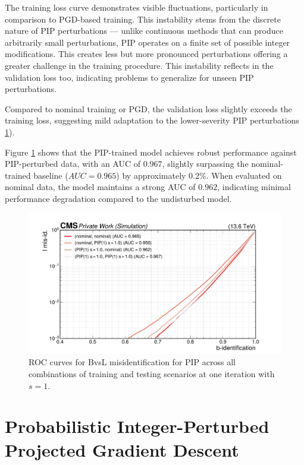 The training loss curve demonstrates visible fluctuations, particularly in comparison to PGD-based training. This instability stems from the discrete nature of PIP perturbations — unlike continuous methods that can produce arbitrarily small perturbations, PIP operates on a finite set of possible integer modifications. This creates less but more pronounced perturbations offering a greater challenge in the training procedure. This instability reflects in the validation loss too, indicating problems to generalize for unseen PIP perturbations. 

Compared to nominal training or PGD, the validation loss slightly exceeds the training loss, suggesting mild adaptation to the lower-severity PIP perturbations \ref{fig:intprob_rocs_training}).

Figure \ref{fig:intprob_rocs_training} shows that the PIP-trained model achieves robust performance against PIP-perturbed data, with an AUC of $0.967$, slightly surpassing the nominal-trained baseline ($AUC = 0.965$) by approximately $0.2\%$. When evaluated on nominal data, the model maintains a strong AUC of $0.962$, indicating minimal performance degradation compared to the undisturbed model.

\begin{figure}[h]
\centering
    \includegraphics[width=15cm]{media/output/roc_bvsl_intprob_permutations.pdf}
    \caption{ROC curves for BvsL misidentification for PIP across all combinations of training and testing scenarios at one iteration with $s=1$.}
    \label{fig:intprob_rocs_training}
\end{figure}

\FloatBarrier
\section{Probabilistic Integer-Perturbed Projected Gradient Descent}

